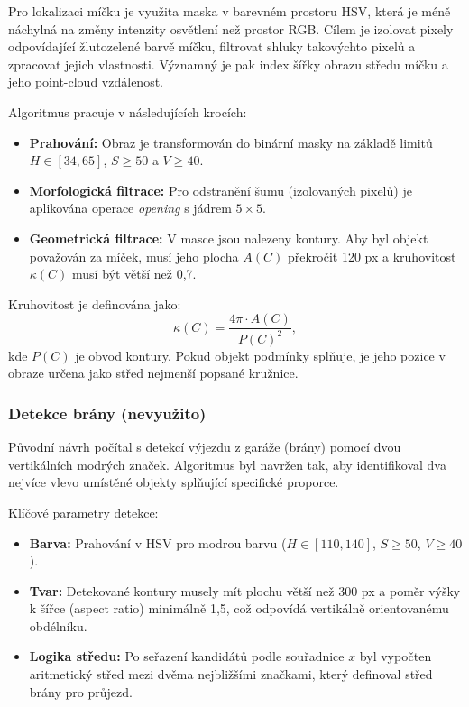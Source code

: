 \documentclass[12pt, a4paper, oneside]{article}
\begin{document}
Pro lokalizaci míčku je využita maska v barevném prostoru HSV, která je méně náchylná na změny intenzity osvětlení než prostor RGB. Cílem je izolovat pixely odpovídající žlutozelené barvě míčku, filtrovat shluky takovýchto pixelů a zpracovat jejich vlastnosti. Významný je pak index šířky obrazu středu míčku a jeho point-cloud vzdálenost.

Algoritmus pracuje v následujících krocích:
\begin{itemize}
    \item \textbf{Prahování:} Obraz je transformován do binární masky na základě limitů $H \in [34, 65]$, $S \ge 50$ a $V \ge 40$.
    \item \textbf{Morfologická filtrace:} Pro odstranění šumu (izolovaných pixelů) je aplikována operace \textit{opening} s jádrem $5\times5$.
    \item \textbf{Geometrická filtrace:} V masce jsou nalezeny kontury. Aby byl objekt považován za míček, musí jeho plocha $A(C)$ překročit 120 px a kruhovitost $\kappa(C)$ musí být větší než 0,7.
\end{itemize}

Kruhovitost je definována jako:
\begin{equation}
  \kappa(C) = \frac{4\pi \cdot A(C)}{P(C)^2},
  \label{eq:circularity}
\end{equation}
kde $P(C)$ je obvod kontury. Pokud objekt podmínky splňuje, je jeho pozice v obraze určena jako střed nejmenší popsané kružnice.

\subsubsection{Detekce brány (nevyužito)}

Původní návrh počítal s detekcí výjezdu z garáže (brány) pomocí dvou vertikálních modrých značek. Algoritmus byl navržen tak, aby identifikoval dva nejvíce vlevo umístěné objekty splňující specifické proporce.

Klíčové parametry detekce:
\begin{itemize}
    \item \textbf{Barva:} Prahování v HSV pro modrou barvu ($H \in [110, 140]$, $S \ge 50$, $V \ge 40$).
    \item \textbf{Tvar:} Detekované kontury musely mít plochu větší než 300 px a poměr výšky k šířce (aspect ratio) minimálně 1,5, což odpovídá vertikálně orientovanému obdélníku.
    \item \textbf{Logika středu:} Po seřazení kandidátů podle souřadnice $x$ byl vypočten aritmetický střed mezi dvěma nejbližšími značkami, který definoval střed brány pro průjezd.
\end{itemize}
\end{document}
